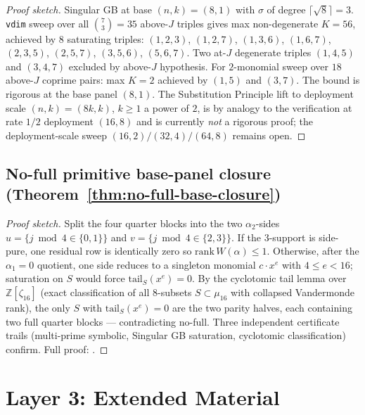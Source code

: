\documentclass[11pt]{article}
\theoremstyle{definition}
\theoremstyle{remark}
\begin{document}
\begin{proof}[Proof sketch]
Singular GB at base $(n, k) = (8, 1)$ with $\sigma$ of degree
$\lceil\sqrt{8}\rceil = 3$. \texttt{vdim} sweep over all $\binom{7}{3} = 35$
above-$J$ triples gives max non-degenerate $K = 56$, achieved by
$8$ saturating triples: $(1, 2, 3)$, $(1, 2, 7)$, $(1, 3, 6)$, $(1, 6, 7)$,
$(2, 3, 5)$, $(2, 5, 7)$, $(3, 5, 6)$, $(5, 6, 7)$. Two at-$J$ degenerate
triples $(1, 4, 5)$ and $(3, 4, 7)$ excluded by above-$J$ hypothesis.
For $2$-monomial sweep over $18$ above-$J$ coprime pairs: max $K = 2$
achieved by $(1, 5)$ and $(3, 7)$. The bound is rigorous at the base
panel $(8, 1)$. The Substitution Principle lift to deployment scale
$(n, k) = (8k, k)$, $k \geq 1$ a power of $2$, is by analogy to the
verification at rate $1/2$ deployment $(16, 8)$ and is currently
\emph{not} a rigorous proof; the deployment-scale sweep
$(16, 2) / (32, 4) / (64, 8)$ remains open.
\end{proof}

\subsection{No-full primitive base-panel closure (Theorem~\ref{thm:no-full-base-closure})}
\label{prf:thm:no-full-base-closure}

\begin{proof}[Proof sketch]
Split the four quarter blocks into the two $\alpha_2$-sides $u =
\{j \bmod 4 \in \{0,1\}\}$ and $v = \{j \bmod 4 \in \{2,3\}\}$. If
the 3-support is side-pure, one residual row is identically zero so
$\mathrm{rank}\, W(\alpha) \leq 1$. Otherwise, after the
$\alpha_1 = 0$ quotient, one side reduces to a singleton monomial
$c \cdot x^e$ with $4 \leq e < 16$; saturation on $S$ would force
$\mathrm{tail}_S(x^e) = 0$. By the cyclotomic tail lemma over
$\mathbb{Z}[\zeta_{16}]$ (exact classification of all $8$-subsets
$S \subset \mu_{16}$ with collapsed Vandermonde rank), the only $S$
with $\mathrm{tail}_S(x^e) = 0$ are the two parity halves, each
containing two full quarter blocks --- contradicting no-full. Three
independent certificate trails (multi-prime symbolic, Singular GB
saturation, cyclotomic classification) confirm. Full proof: \cite{CompanionRepo}.
\end{proof}




\section{Layer 3: Extended Material}
\label{app:layer3-extended}
\end{document}
